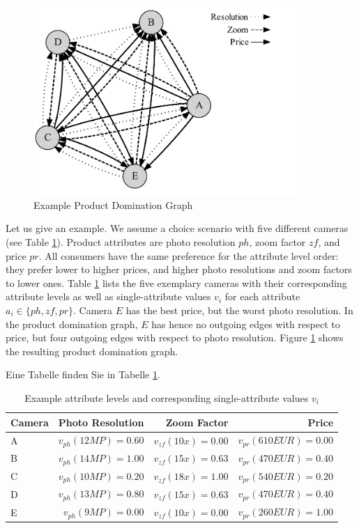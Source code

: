 \begin{figure}[t]
  	\caption{Example Product Domination Graph}\label{fig:productGraph}
  	\begin{center}
 		\includegraphics[width=10cm]{graphics/ProductDominationGraph}
 	\end{center}
\end{figure}

Let us give an example. We assume a choice scenario with five different cameras (see Table \ref{tab:cameras}). Product attributes are photo resolution $ph$, zoom factor $zf$, and price $pr$. All consumers have the same preference for the attribute level order: they prefer lower to higher prices, and higher photo resolutions and zoom factors to lower ones. Table \ref{tab:cameras} lists the five exemplary cameras with their corresponding attribute levels as well as single-attribute values $v_{i}$ for each attribute $a_i\in\{ph, zf, pr\}$.
Camera $E$ has the best price, but the worst photo resolution. In the product domination graph, $E$ has hence no outgoing edges with respect to price, but four outgoing edges with respect to photo resolution. Figure \ref{fig:productGraph} shows the resulting product domination graph.

Eine Tabelle finden Sie in Tabelle \ref{tab:cameras}.
\begin{table}%
	\caption{Example attribute levels and corresponding single-attribute values $v_i$}\label{tab:cameras}
	\begin{center}\small
		\begin{tabular}{lrrr}  		
			\hline
			Camera & Photo Resolution & Zoom Factor & Price\\
			\hline
			A & $v_{ph}(12 MP) = 0.60$ & $v_{zf}(10x) = 0.00$ & $v_{pr}(610 EUR) = 0.00$\\
			B & $v_{ph}(14 MP) = 1.00$ & $v_{zf}(15x) = 0.63$ & $v_{pr}(470 EUR) = 0.40$\\
			C & $v_{ph}(10 MP) = 0.20$ & $v_{zf}(18x) = 1.00$ & $v_{pr}(540 EUR) = 0.20$\\
			D & $v_{ph}(13 MP) = 0.80$ & $v_{zf}(15x) = 0.63$ & $v_{pr}(470 EUR) = 0.40$\\
			E & $v_{ph}(9 MP) = 0.00$ & $v_{zf}(10x) = 0.00$ & $v_{pr}(260 EUR) = 1.00$\\
			\hline
		\end{tabular}
	\end{center}
\end{table} 	

